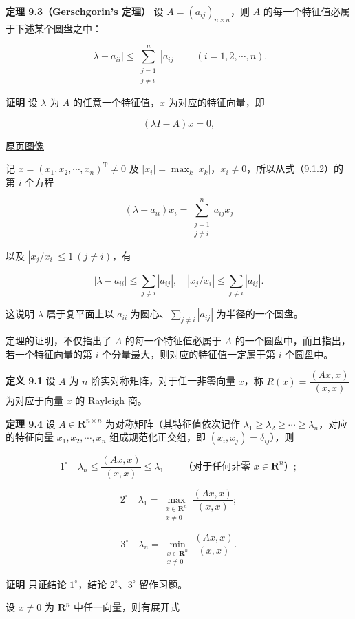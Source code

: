 \documentclass[
  10pt,
  fontset=fandol]{ctexart}
\begin{document}
\textbf{定理 9.3（Gerschgorin's 定理）} 设 \(A=(a_{ij})_{n\times n}\)，则 \(A\) 的每一个特征值必属于下述某个圆盘之中：

\[
|\lambda-a_{ii}|\leq\sum_{\substack{j=1\\j\ne i}}^n|a_{ij}|\qquad(i=1,2,\cdots,n).
\]

\textbf{证明} 设 \(\lambda\) 为 \(A\) 的任意一个特征值，\(x\) 为对应的特征向量，即

\[
(\lambda I-A)x=0,
\]

\href{../../source-images/pdf-234.jpeg}{原页图像}

记 \(x=(x_1,x_2,\cdots,x_n)^{\mathrm T}\ne0\) 及 \(|x_i|=\max_k|x_k|\)，\(x_i\ne0\)，所以从式（9.1.2）的第 \(i\) 个方程

\[
(\lambda-a_{ii})x_i=\sum_{\substack{j=1\\j\ne i}}^na_{ij}x_j
\]

以及 \(|x_j/x_i|\leq1\ (j\ne i)\)，有

\[
|\lambda-a_{ii}|\leq\sum_{j\ne i}|a_{ij}|,\quad |x_j/x_i|\leq\sum_{j\ne i}|a_{ij}|.
\]

这说明 \(\lambda\) 属于复平面上以 \(a_{ii}\) 为圆心、\(\sum_{j\ne i}|a_{ij}|\) 为半径的一个圆盘。

定理的证明，不仅指出了 \(A\) 的每一个特征值必属于 \(A\) 的一个圆盘中，而且指出，若一个特征向量的第 \(i\) 个分量最大，则对应的特征值一定属于第 \(i\) 个圆盘中。

\textbf{定义 9.1} 设 \(A\) 为 \(n\) 阶实对称矩阵，对于任一非零向量 \(x\)，称 \(R(x)=\dfrac{(Ax,x)}{(x,x)}\) 为对应于向量 \(x\) 的 Rayleigh 商。

\textbf{定理 9.4} 设 \(A\in\mathbf R^{n\times n}\) 为对称矩阵（其特征值依次记作 \(\lambda_1\geq\lambda_2\geq\cdots\geq\lambda_n\)，对应的特征向量 \(x_1,x_2,\cdots,x_n\) 组成规范化正交组，即 \((x_i,x_j)=\delta_{ij}\)），则

\[
1^\circ\quad \lambda_n\leq\frac{(Ax,x)}{(x,x)}\leq\lambda_1\qquad\text{（对于任何非零 }x\in\mathbf R^n\text{）};
\]

\[
2^\circ\quad \lambda_1=\max_{\substack{x\in\mathbf R^n\\x\ne0}}\frac{(Ax,x)}{(x,x)};
\]

\[
3^\circ\quad \lambda_n=\min_{\substack{x\in\mathbf R^n\\x\ne0}}\frac{(Ax,x)}{(x,x)}.
\]

\textbf{证明} 只证结论 \(1^\circ\)，结论 \(2^\circ\)、\(3^\circ\) 留作习题。

设 \(x\ne0\) 为 \(\mathbf R^n\) 中任一向量，则有展开式
\end{document}
